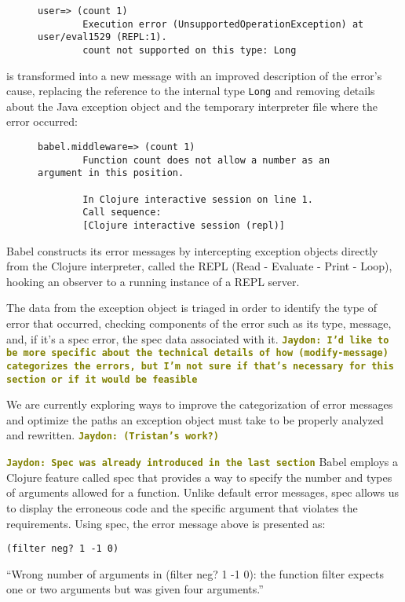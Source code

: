 \documentclass[12pt]{article}
\newcommand{\comment}[1]{{\bf \tt  {#1}}}
\newcommand{\jscomment}[1]{\textcolor{olive}{\comment{Jaydon: {#1}}}}
\begin{document}
\begin{figure}[h]
	\centering
	\begin{lstlisting}[breaklines=true, basicstyle=\ttfamily]
        user=> (count 1)
        Execution error (UnsupportedOperationException) at user/eval1529 (REPL:1).
        count not supported on this type: Long
	\end{lstlisting}
\end{figure}

is transformed into a new message with an improved description of the error's cause, replacing the reference to the internal type \verb|Long| and removing details about the Java exception object and the temporary interpreter file where the error occurred:

\begin{figure}[h]
	\centering
	\begin{lstlisting}[breaklines=true, basicstyle=\ttfamily]
        babel.middleware=> (count 1)
        Function count does not allow a number as an argument in this position.

        In Clojure interactive session on line 1.
        Call sequence:
        [Clojure interactive session (repl)]
	\end{lstlisting}
\end{figure}

Babel constructs its error messages by intercepting exception objects directly from the Clojure interpreter, called the REPL (Read - Evaluate - Print - Loop), hooking an observer to a running instance of a REPL server.

The data from the exception object is triaged in order to identify the type of error that occurred, checking components of the error such as its type, message, and, if it's a spec error, the spec data associated with it.
\jscomment{I'd like to be more specific about the technical details of how (modify-message) categorizes the errors, but I'm not sure if that's necessary for this section or if it would be feasible}

We are currently exploring ways to improve the categorization of error messages and optimize the paths an exception object must take to be properly analyzed and rewritten. \jscomment{(Tristan's work?)}

\jscomment{Spec was already introduced in the last section}
Babel employs a Clojure feature called spec that provides a way to specify the number and types of arguments allowed for a function. 
Unlike default error messages, spec allows us to display the erroneous code and the specific argument that violates the requirements. 
Using spec, the error message above is presented as: 
\begin{verbatim}
(filter neg? 1 -1 0)
\end{verbatim}
``Wrong number of arguments in (filter neg? 1 -1 0): the function filter expects one or two arguments but was given four arguments.''
\end{document}
